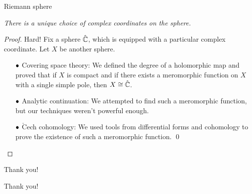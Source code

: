 \documentclass{beamer}
\begin{document}
    \begin{frame}{Riemann sphere}
        \begin{theorem}[Uniformization]
            \textit{There is a unique choice of complex coordinates on the sphere.}
        \end{theorem}

        \pause

        \begin{proof}
            Hard!
            \pause
            Fix a sphere $\hat{\mathbb{C}}$, which is equipped with a particular complex coordinate. Let $X$ be another sphere.
            \pause
            \begin{itemize}
                \item[\scriptsize$\bullet$] \scriptsize Covering space theory: We defined the degree of a holomorphic map and proved that if $X$ is compact and if there exists a meromorphic function on $X$ with a single simple pole, then $X\cong\hat{\mathbb{C}}$.
                    \pause
                \item[\scriptsize$\bullet$] \scriptsize Analytic continuation: We attempted to find such a meromorphic function, but our techniques weren't powerful enough.
                    \pause
                \item[\scriptsize$\bullet$] \scriptsize $\check{\textrm{C}}$ech cohomology: We used tools from differential forms and cohomology to prove the existence of such a meromorphic function.
                    \pause\qed
            \end{itemize}
        \end{proof}
    \end{frame}
    \begin{frame}{Thank you!}
        \begin{center}
            Thank you!
        \end{center}
    \end{frame}
\end{document}
